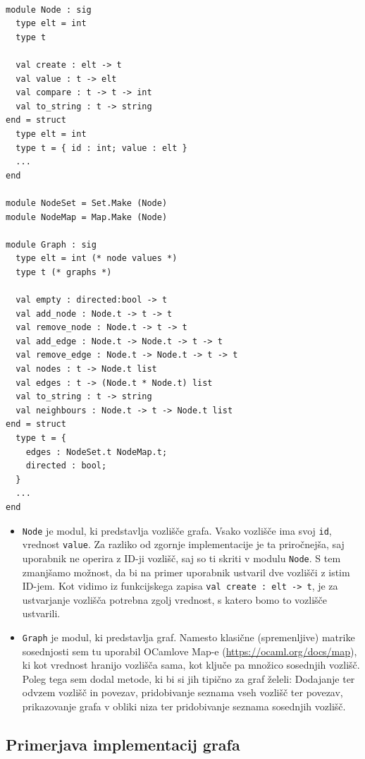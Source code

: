 \documentclass[mat1, tisk]{fmfdelo}
\begin{document}
\begin{lstlisting}

module Node : sig
  type elt = int
  type t

  val create : elt -> t
  val value : t -> elt
  val compare : t -> t -> int
  val to_string : t -> string
end = struct
  type elt = int
  type t = { id : int; value : elt }
  ...
end

module NodeSet = Set.Make (Node)
module NodeMap = Map.Make (Node)

module Graph : sig
  type elt = int (* node values *)
  type t (* graphs *)

  val empty : directed:bool -> t
  val add_node : Node.t -> t -> t
  val remove_node : Node.t -> t -> t
  val add_edge : Node.t -> Node.t -> t -> t
  val remove_edge : Node.t -> Node.t -> t -> t
  val nodes : t -> Node.t list
  val edges : t -> (Node.t * Node.t) list
  val to_string : t -> string
  val neighbours : Node.t -> t -> Node.t list
end = struct
  type t = {
    edges : NodeSet.t NodeMap.t;
    directed : bool;
  }
  ...
end

\end{lstlisting}

\begin{itemize}
  \item \texttt{Node} je modul, ki predstavlja vozlišče grafa. Vsako vozlišče ima svoj \texttt{id}, vrednost \texttt{value}.
        Za razliko od zgornje implementacije je ta priročnejša, saj uporabnik ne operira z ID-ji vozlišč, saj so ti skriti v modulu \texttt{Node}.
        S tem zmanjšamo možnost, da bi na primer uporabnik ustvaril dve vozlišči z istim ID-jem. Kot vidimo iz funkcijskega zapisa
        \texttt{val create : elt -> t}, je za ustvarjanje vozlišča potrebna zgolj vrednost, s katero bomo to vozlišče ustvarili.
  \item \texttt{Graph} je modul, ki predstavlja graf. Namesto klasične (spremenljive) matrike sosednjosti sem tu uporabil OCamlove
        Map-e (\url{https://ocaml.org/docs/map}), ki kot vrednost hranijo vozlišča sama, kot ključe pa množico sosednjih vozlišč.
        Poleg tega sem dodal metode, ki bi si jih tipično za graf želeli: Dodajanje ter odvzem vozlišč in povezav, pridobivanje seznama vseh vozlišč ter povezav,
        prikazovanje grafa v obliki niza ter pridobivanje seznama sosednjih vozlišč.
\end{itemize}



\subsection{Primerjava implementacij grafa} \label{sec:primerjava_implementacij_grafa}
\end{document}
